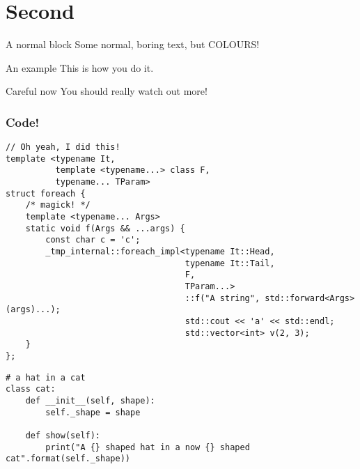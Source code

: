\documentclass[mathserif, fleqn]{beamer}
\begin{document}
\section{Second}
\begin{frame}
  \begin{block}{A normal block}
    Some normal, boring text, but COLOURS!
  \end{block}
  \begin{exampleblock}{An example}
    This is how you do it.
  \end{exampleblock}
  \begin{alertblock}{Careful now}
    You should really watch out more!
  \end{alertblock}
\end{frame}

\begin{frame}[fragile]
  \frametitle{Code!}
  \begin{lstlisting}[caption={A test listing}]
// Oh yeah, I did this!
template <typename It,
          template <typename...> class F,
          typename... TParam>
struct foreach {
    /* magick! */
    template <typename... Args>
    static void f(Args && ...args) {
        const char c = 'c';
        _tmp_internal::foreach_impl<typename It::Head,
                                    typename It::Tail,
                                    F,
                                    TParam...>
                                    ::f("A string", std::forward<Args>(args)...);
                                    std::cout << 'a' << std::endl;
                                    std::vector<int> v(2, 3);
    }
};
  \end{lstlisting}
\end{frame}

\begin{frame}[fragile]
  \lstset{language=python}
  \begin{lstlisting}[caption={Some Python as well}]
# a hat in a cat
class cat:
    def __init__(self, shape):
        self._shape = shape

    def show(self):
        print("A {} shaped hat in a now {} shaped cat".format(self._shape))
  \end{lstlisting}
\end{frame}
\end{document}
